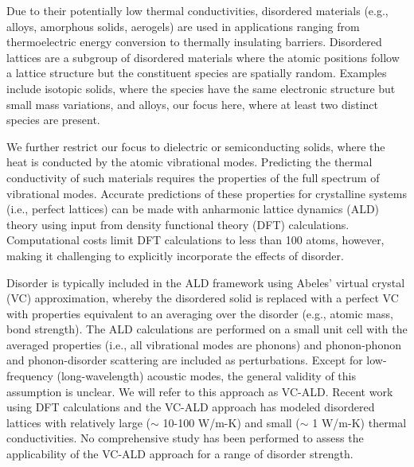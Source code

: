 Due to their potentially low thermal conductivities, 
disordered materials (e.g., alloys, amorphous solids, aerogels) 
are used in 
applications ranging from thermoelectric energy conversion to 
thermally insulating barriers.
\cite{graebner_phonon_1986,cahill_lattice_1988,lu_thermal_1992,chen_recent_2003,clarke_thermal_2005,snyder_complex_2008,minnich_bulk_2009,toberer_phonon_2011,zebarjadi_perspectives_2012,schiffres_gas_2012} 
Disordered lattices are a subgroup of disordered materials where 
the atomic positions follow a lattice structure but the 
constituent species are spatially random. Examples include isotopic 
solids, where the species have the same electronic structure but 
small mass variations,\cite{tamura_isotope_1983,lindsay_thermal_2012} 
and alloys, our focus here, where at least two distinct 
species are present.\cite{abeles_thermal_1962,abeles_lattice_1963}

We further restrict our focus to dielectric or semiconducting solids,  
where the heat is conducted by the atomic vibrational modes. 
Predicting the thermal conductivity of such materials 
requires the properties of the full spectrum of vibrational modes.
\cite{ziman_electrons_2001,feldman_thermal_1993,allen_diffusons_1999} 
Accurate predictions of these properties for 
crystalline systems (i.e., perfect lattices)  
can be made with anharmonic lattice dynamics (ALD) theory 
using input from density functional theory (DFT)  
calculations.\cite{broido_intrinsic_2007,ward_intrinsic_2010,lindsay_thermal_2012,garg_role_2011,shiga_microscopic_2012,tian_phonon_2012,shiomi_thermal_2011,esfarjani_heat_2011,li_thermal_2012,luckyanova_coherent_2012}
Computational costs limit DFT calculations to less than 100 atoms, 
however, making it challenging to explicitly incorporate the effects 
of disorder.
\cite{ward_ab_2009,garg_role_2011,bao_first-principles_2012,sosso_thermal_2012,lindsay_thermal_2012,tian_phonon_2012,li_thermal_2012}

Disorder is typically included in the ALD framework using Abeles' 
virtual crystal (VC) approximation, whereby the disordered  
solid is replaced with a perfect VC with properties 
equivalent to an averaging over the disorder 
(e.g., atomic mass, bond strength).\cite{abeles_lattice_1963}
The ALD calculations are performed on a small 
unit cell with the averaged properties 
(i.e., all vibrational modes are phonons) and 
phonon-phonon and phonon-disorder scattering 
are included as perturbations.
\cite{abeles_lattice_1963,tamura_isotope_1983,garg_role_2011,tian_phonon_2012,lindsay_thermal_2012} 
Except for low-frequency (long-wavelength) acoustic modes,
the general validity of this assumption is unclear. 
We will refer to this approach as VC-ALD. 
Recent work using DFT calculations and the VC-ALD approach has 
modeled disordered lattices with relatively large 
($\sim$ 10-100 W/m-K)
\cite{garg_role_2011,lindsay_thermal_2012,li_thermal_2012} and 
small ($\sim$ 1 W/m-K)\cite{tian_phonon_2012} 
thermal conductivities. No comprehensive study has 
been performed to assess the applicability of the VC-ALD approach for a 
range of disorder strength.


